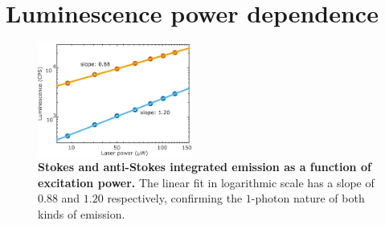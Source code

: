\documentclass[journal=nalefd,manuscript=letter]{achemso}
\begin{document}
%
%
%


\pagebreak
\section{Luminescence power dependence}

\begin{figure}[htp] \centering
\includegraphics[width=0.45\textwidth]{Figures/Supplementary/03_AS_S_in_Log/03_AS_S_in_Log.png}
\caption{\textbf{Stokes and anti-Stokes integrated emission as a function of excitation power.} The
linear fit in logarithmic scale has a slope of $0.88$ and $1.20$ respectively,
confirming the $1$-photon nature of both kinds of emission.}
	\label{fig:Log_Plot}
\end{figure}
\end{document}

